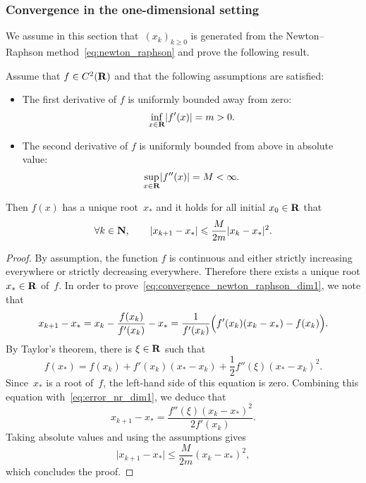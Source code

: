 \subsubsection*{Convergence in the one-dimensional setting}
We assume in this section that~$(x_k)_{k\geq 0}$ is generated from the Newton--Raphson method~\eqref{eq:newton_raphson} and prove the following result.
\begin{theorem}
    \label{theorem:newton_raphson_1d}
    Assume that $f \in C^2(\mathbf R)$ and that the following assumptions are satisfied:
    \begin{itemize}
        \item
            The first derivative of $f$ is uniformly bounded away from zero:
            \[
                \inf_{x \in \mathbf R} \lvert f'(x)\rvert = m > 0.
            \]

        \item
            The second derivative of $f$ is uniformly bounded from above in absolute value:
            \[
                \sup_{x \in \mathbf R} \lvert f''(x)\rvert = M < \infty.
            \]
    \end{itemize}
    Then $f(x)$ has a unique root~$x_*$ and it holds for all initial $x_0 \in \mathbf R$ that
    \begin{equation}
        \label{eq:convergence_newton_raphson_dim1}
        \forall k \in \mathbf N, \qquad
        \lvert x_{k+1} - x_*\rvert \leqslant \frac{M}{2m} \lvert x_{k} - x_*\rvert^2.
    \end{equation}
\end{theorem}
\begin{proof}
    By assumption, the function $f$ is continuous and either strictly increasing everywhere or strictly decreasing everywhere.
    Therefore there exists a unique root $x_* \in \mathbf R$ of~$f$.
    In order to prove~\eqref{eq:convergence_newton_raphson_dim1},
    we note that
    \begin{equation}
        \label{eq:error_nr_dim1}
        x_{k+1} - x_*
        = x_{k} - \frac{f(x_k)}{f'(x_k)}  - x_*
        = \frac{1}{f'(x_k)} \Bigl(f'(x_k)(x_{k} - x_*) - f(x_k)\Bigr).
    \end{equation}
    By Taylor's theorem, there is $\xi \in \mathbf R$ such that
    \[
        f(x_*) = f(x_k) + f'(x_k) (x_* - x_k) + \frac{1}{2} f''(\xi) (x_* - x_k)^2.
    \]
    Since~$x_*$ is a root of~$f$,
    the left-hand side of this equation is zero.
    Combining this equation with~\eqref{eq:error_nr_dim1},
    we deduce that
    \[
        x_{k+1} - x_*  = \frac{f''(\xi) (x_k - x_*)^2}{2f'(x_k)}.
    \]
    Taking absolute values and using the assumptions gives
    \[
        \lvert x_{k+1} - x_* \rvert
        \leq \frac{M}{2m} (x_k - x_*)^2,
    \]
    which concludes the proof.
\end{proof}

